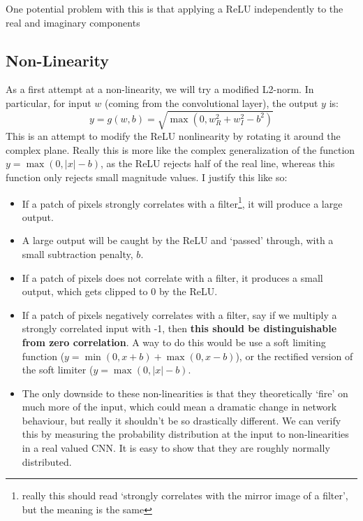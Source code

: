 One potential problem with this is
that applying a ReLU independently to the real and imaginary components

\subsection{Non-Linearity}
\renewcommand{\SigIn}{w}
\renewcommand{\SigOut}{y}

	\begin{figure}[!h]
    \centering
    
	\end{figure}
	
As a first attempt at a non-linearity, we will try a modified L2-norm. In 
particular, for input $\SigIn$ (coming from the convolutional layer), the
output $\SigOut$ is:
\begin{equation}
	\SigOut = g(\SigIn, b) = \sqrt{\max(0, \SigIn_R^2 + \SigIn_I^2 - b^2)}
\end{equation}
This is an attempt to modify the ReLU nonlinearity by rotating it
around the complex plane. Really this is more like the complex generalization
of the function $y = \max(0, |x| -b)$, as the ReLU rejects half of the real
line, whereas this function only rejects small magnitude values. I justify
this like so:
\begin{itemize}
  \item If a patch of pixels strongly correlates with
    a filter\footnote{really this should read `strongly correlates with the
    mirror image of a filter', but the meaning is the same}, it will
    produce a large output. 
  \item A large output will be caught by the ReLU and `passed' through, with
    a small subtraction penalty, $b$.
  \item If a patch of pixels does not correlate with a filter, it produces
    a small output, which gets clipped to 0 by the ReLU.
  \item If a patch of pixels negatively correlates with a filter, say if we
    multiply a strongly correlated input with -1, then
    \textbf{this should be distinguishable from zero correlation}. A way to
    do this would be use a soft limiting function ($y=\min(0,x+b)
    + \max(0,x-b)$), or the rectified version of the soft limiter
    ($y=\max(0,|x| - b)$.
  \item The only downside to these non-linearities is that they theoretically
    `fire' on much more of the input, which could mean a dramatic change in
    network behaviour, but really it shouldn't be so drastically different.
    We can verify this by measuring the probability distribution at the 
    input to non-linearities in a real valued CNN. It is easy to show that
    they are roughly normally distributed.
\end{itemize}

